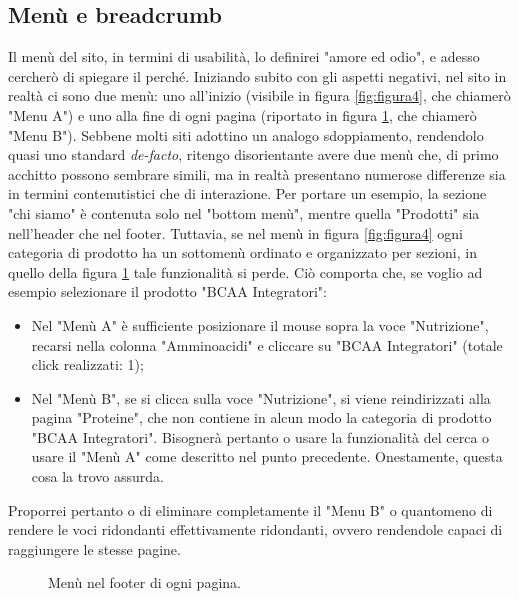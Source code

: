 \subsection{Menù e breadcrumb}
Il menù del sito, in termini di usabilità, lo definirei "amore ed odio", e adesso cercherò di spiegare il perché. 
Iniziando subito con gli aspetti negativi, nel sito in realtà ci sono due menù: uno all'inizio (visibile in figura \ref{fig:figura4}, che chiamerò "Menu A") e uno alla fine di ogni pagina (riportato in figura \ref{fig:figura13}, che chiamerò "Menu B"). Sebbene molti siti adottino un analogo sdoppiamento, rendendolo quasi uno standard \textit{de-facto}, ritengo disorientante avere due menù che, di primo acchitto possono sembrare simili, ma in realtà presentano numerose differenze sia in termini contenutistici che di interazione. Per portare un esempio, la sezione "chi siamo" è contenuta solo nel "bottom menù", mentre quella "Prodotti" sia nell'header che nel footer. Tuttavia, se nel menù in figura \ref{fig:figura4} ogni categoria di prodotto ha un sottomenù ordinato e organizzato per sezioni, in quello della figura \ref{fig:figura13} tale funzionalità si perde. Ciò comporta che, se voglio ad esempio selezionare il prodotto "BCAA Integratori":
\begin{itemize}
	\item Nel "Menù A" è sufficiente posizionare il mouse sopra la voce "Nutrizione", recarsi nella colonna "Amminoacidi" e cliccare su "BCAA Integratori" (totale click realizzati: 1);
	\item Nel "Menù B", se si clicca sulla voce "Nutrizione", si viene reindirizzati alla pagina "Proteine", che non contiene in alcun modo la categoria di prodotto "BCAA Integratori". Bisognerà pertanto o usare la funzionalità del cerca o usare il "Menù A" come descritto nel punto precedente. Onestamente, questa cosa la trovo assurda.
\end{itemize}
Proporrei pertanto o di eliminare completamente il "Menu B" o quantomeno di rendere le voci ridondanti effettivamente ridondanti, ovvero rendendole capaci di raggiungere le stesse pagine.
\begin{figure}[!htb]
	\caption{\label{fig:figura13}} Menù nel footer di ogni pagina.
\end{figure}\\

